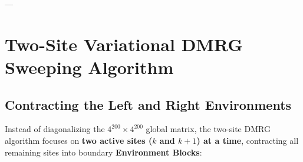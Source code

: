 \documentclass[
    12pt,
    a4paper,
    headings=normal,
    twoside=false,
    open=any,
    parskip=half
]{scrbook}
\begin{document}
---

\section{Two-Site Variational DMRG Sweeping Algorithm}
\label{sec:ch4_dmrg_sweeping}

\subsection{Contracting the Left and Right Environments}

Instead of diagonalizing the $4^{200} \times 4^{200}$ global matrix, the two-site DMRG algorithm focuses on \textbf{two active sites ($k$ and $k+1$) at a time}, contracting all remaining sites into boundary \textbf{Environment Blocks}:
\end{document}
